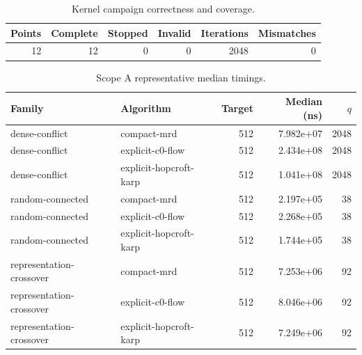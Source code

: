 \begin{table}[t]
\caption{Kernel campaign correctness and coverage.}
\label{tab:kernel-coverage}
\begin{tabular}{rrrrrr}
\toprule
Points & Complete & Stopped & Invalid & Iterations & Mismatches \\
\midrule
12 & 12 & 0 & 0 & 2048 & 0 \\
\bottomrule
\end{tabular}
\end{table}

\begin{table}[t]
\caption{Scope A representative median timings.}
\label{tab:kernel-scope-a}
\begin{tabular}{llrrr}
\toprule
Family & Algorithm & Target & Median (ns) & $q$ \\
\midrule
dense-conflict & compact-mrd & 512 & 7.982e+07 & 2048 \\
dense-conflict & explicit-c0-flow & 512 & 2.434e+08 & 2048 \\
dense-conflict & explicit-hopcroft-karp & 512 & 1.041e+08 & 2048 \\
random-connected & compact-mrd & 512 & 2.197e+05 & 38 \\
random-connected & explicit-c0-flow & 512 & 2.268e+05 & 38 \\
random-connected & explicit-hopcroft-karp & 512 & 1.744e+05 & 38 \\
representation-crossover & compact-mrd & 512 & 7.253e+06 & 92 \\
representation-crossover & explicit-c0-flow & 512 & 8.046e+06 & 92 \\
representation-crossover & explicit-hopcroft-karp & 512 & 7.249e+06 & 92 \\
\bottomrule
\end{tabular}
\end{table}

